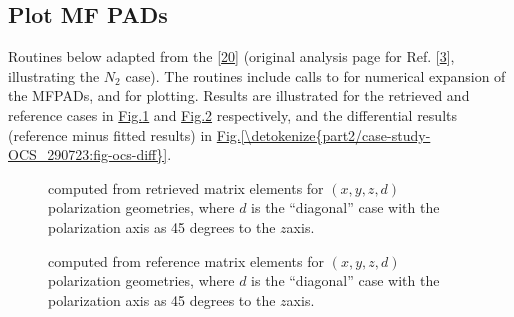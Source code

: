 \documentclass[letterpaper,table,10pt,english]{jupyterBook}
\begin{document}
\subsection{Plot MF PADs}
\label{\detokenize{part2/case-study-OCS_290723:plot-mf-pads}}
\sphinxAtStartPar
Routines below adapted from the  {[}\hyperlink{cite.backmatter/bibliography:id681}{20}{]}  (original analysis page for Ref. {[}\hyperlink{cite.backmatter/bibliography:id686}{3}{]}, illustrating the \(N_2\) case). The routines include calls to  for numerical expansion of the MF\sphinxhyphen{}PADs, and  for plotting. Results are illustrated for the retrieved and reference cases in \hyperref[\detokenize{part2/case-study-OCS_290723:fig-ocs-compc}]{Fig.\@ \ref{\detokenize{part2/case-study-OCS_290723:fig-ocs-compc}}} and \hyperref[\detokenize{part2/case-study-OCS_290723:fig-ocs-ref}]{Fig.\@ \ref{\detokenize{part2/case-study-OCS_290723:fig-ocs-ref}}} respectively, and the differential results (reference minus fitted results) in \hyperref[\detokenize{part2/case-study-OCS_290723:fig-ocs-diff}]{Fig.\@ \ref{\detokenize{part2/case-study-OCS_290723:fig-ocs-diff}}}.

\begin{figure}[htbp]
\centering
\capstart

\noindent{}
\caption{{\hyperref[\detokenize{backmatter/glossary:term-MF}]{}} computed from retrieved matrix elements for \((x,y,z,d)\) polarization geometries, where \(d\) is the “diagonal” case with the polarization axis as 45 degrees to the \(z\)\sphinxhyphen{}axis.}\label{\detokenize{part2/case-study-OCS_290723:fig-ocs-compc}}\end{figure}

\begin{figure}[htbp]
\centering
\capstart

\noindent{}
\caption{{\hyperref[\detokenize{backmatter/glossary:term-MF}]{}} computed from reference  matrix elements for \((x,y,z,d)\) polarization geometries, where \(d\) is the “diagonal” case with the polarization axis as 45 degrees to the \(z\)\sphinxhyphen{}axis.}\label{\detokenize{part2/case-study-OCS_290723:fig-ocs-ref}}\end{figure}
\end{document}
